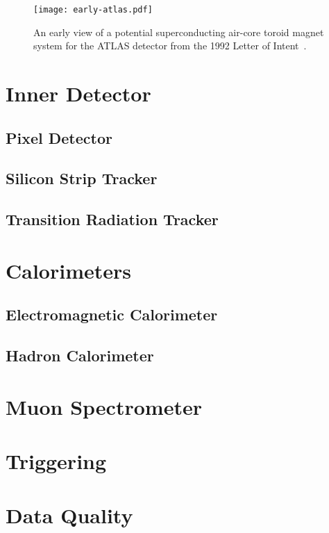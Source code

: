 

\begin{figure}
\centering
\texttt{[image: early-atlas.pdf]}
\label{fig:detector:earlyatlas}
\caption{An early view of a potential superconducting air-core toroid magnet system for the ATLAS detector from the 1992 Letter of Intent~\cite{ATLAS-LoI}.}
\end{figure}


\section{Inner Detector}

\subsection{Pixel Detector}

\subsection{Silicon Strip Tracker}

\subsection{Transition Radiation Tracker}

\section{Calorimeters}

\subsection{Electromagnetic Calorimeter}

\subsection{Hadron Calorimeter}

\section{Muon Spectrometer}

\section{Triggering}

\section{Data Quality}